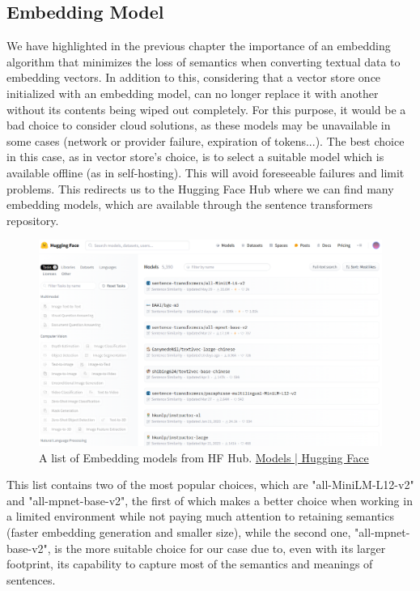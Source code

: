 \subsection{Embedding Model}
We have highlighted in the previous chapter the importance of an embedding algorithm that minimizes the loss of semantics when converting textual data to embedding vectors. In addition to this, considering that a vector store once initialized with an embedding model, can no longer replace it with another without its contents being wiped out completely. For this purpose, it would be a bad choice to consider cloud solutions, as these models may be unavailable in some cases (network or provider failure, expiration of tokens...).\newline
The best choice in this case, as in vector store's choice, is to select a suitable model which is available offline (as in self-hosting). This will avoid foreseeable failures and limit problems.\newline
This redirects us to the Hugging Face Hub where we can find many embedding models, which are available through the sentence transformers repository.
\begin{figure}[H]
    \centering
    \includegraphics[width=.85\linewidth]{./figures/hf-embedding-models.png}
    \caption{A list of Embedding models from HF Hub. \href{https://huggingface.co/models?pipeline_tag=sentence-similarity&sort=likes}{Models | Hugging Face}}
\end{figure}
This list contains two of the most popular choices, which are "all-MiniLM-L12-v2" and "all-mpnet-base-v2", the first of which makes a better choice when working in a limited environment while not paying much attention to retaining semantics (faster embedding generation and smaller size), while the second one, "all-mpnet-base-v2", is the more suitable choice for our case due to, even with its larger footprint, its capability to capture most of the semantics and meanings of sentences.

